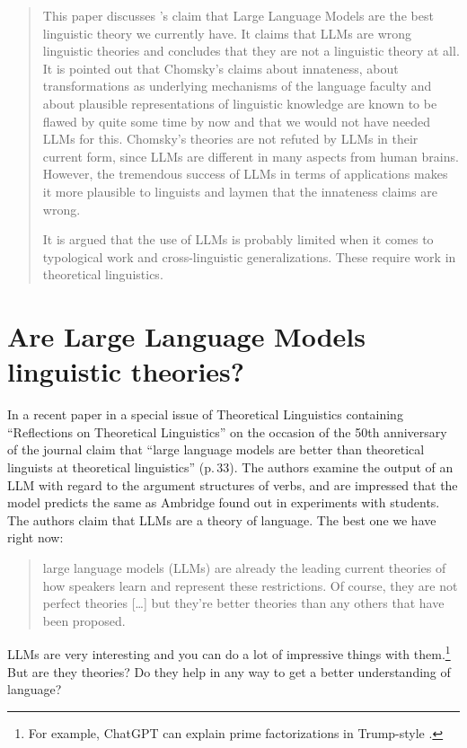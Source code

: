 
\begin{abstract}
This paper discusses \citeauthor{AmbridgeBlything2024a}'s claim \citeyearpar{AmbridgeBlything2024a}
that Large Language Models are the best linguistic theory we currently have. It claims
that LLMs are wrong linguistic theories and concludes that they are not a linguistic theory at
all. It is pointed out that Chomsky's claims about innateness, about transformations as underlying
mechanisms of the language faculty and about plausible representations of linguistic knowledge are
known to be flawed by quite some time by now and that we would not have needed LLMs for
this. Chomsky's theories are not refuted by LLMs in their current form, since LLMs are different in
many aspects from human brains. However, the tremendous success of LLMs in terms of applications
makes it more plausible to linguists and laymen that the innateness claims are wrong. 

It is argued that the use of LLMs is probably limited when it comes to typological work and
cross-linguistic generalizations. These require work in theoretical linguistics.
\end{abstract}

\section{Are Large Language Models linguistic theories?}

In a recent paper in a special issue of Theoretical Linguistics containing ``Reflections on
Theoretical Linguistics'' on the occasion of the 50th anniversary of the journal
\citet{AmbridgeBlything2024a} claim that ``large language models are better than theoretical
linguists at theoretical linguistics'' (p.\,33). The authors examine the output of an LLM with
regard to the argument structures of verbs, and are impressed that the model predicts the same as
Ambridge found out in experiments with students. The authors claim that LLMs are a theory of
language. The best one we have right now:
\begin{quote}
large language models (LLMs) are already the leading current theories of how speakers learn and
represent these restrictions. Of course, they are not perfect theories [\ldots] but they’re better
theories than any others that have been proposed. \citet[]{AmbridgeBlything2024a}
\end{quote}
LLMs are very interesting and you can do a lot of impressive things with them.\footnote{%
For example, ChatGPT can explain prime factorizations in Trump-style \citep[356--357]{Piantadosi2024a}.
} But are they theories? Do they help in any way to get a better understanding of language?

